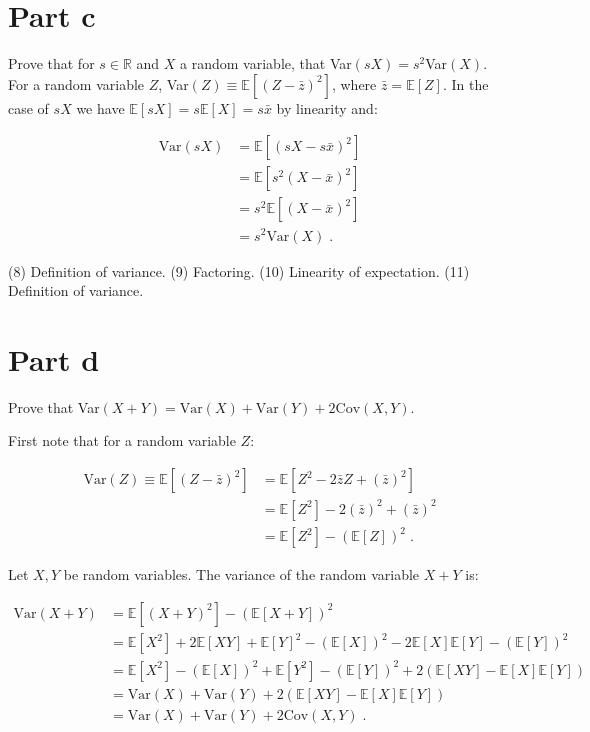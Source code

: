 \documentclass[11pt]{article}
\begin{document}
\section*{Part c}

Prove that for $s \in \mathbb{R}$ and $X$ a random variable, that Var$(sX) = s^2$Var$(X)$. \\

For a random variable $Z$, Var$(Z) \equiv \mathbb{E}[(Z - \bar{z})^2]$, where $\bar{z} = \mathbb{E}[Z]$. In the case of $sX$ we have $\mathbb{E}[sX] = s\mathbb{E}[X] = s\bar{x}$ by linearity and:

\begin{align}
\text{Var}(sX) &= \mathbb{E}[(sX-s\bar{x})^2] \\
&= \mathbb{E}[s^2(X-\bar{x})^2] \\
&= s^2\mathbb{E}[(X-\bar{x})^2]\\
&= s^2 \text{Var}(X) \;.
\end{align}

(8) Definition of variance. (9) Factoring. (10) Linearity of expectation. (11) Definition of variance. 

\section*{Part d}

Prove that Var$(X+Y) = \text{Var}(X) + \text{Var}(Y) + 2\text{Cov}(X,Y)$. 

First note that for a random variable $Z$:

\begin{align*}
\text{Var}(Z) \equiv \mathbb{E}[(Z - \bar{z})^2] &= \mathbb{E}[Z^2 - 2\bar{z}Z + (\bar{z})^2] \\
&= \mathbb{E}[Z^2] -2(\bar{z})^2 + (\bar{z})^2 \\
&= \mathbb{E}[Z^2] - (\mathbb{E}[Z])^2 \;.
\end{align*}

Let $X,Y$ be random variables. The variance of the random variable $X+Y$ is:

\begin{align*}
\text{Var}(X+Y) &= \mathbb{E}[(X+Y)^2] - (\mathbb{E}[X+Y])^2 \\
&= \mathbb{E}[X^2] + 2\mathbb{E}[XY] + \mathbb{E}[Y]^2 - (\mathbb{E}[X])^2 - 2\mathbb{E}[X]\mathbb{E}[Y] - (\mathbb{E}[Y])^2 \\
&= \mathbb{E}[X^2] - (\mathbb{E}[X])^2 + \mathbb{E}[Y^2] - (\mathbb{E}[Y])^2 + 2\left(\mathbb{E}[XY] - \mathbb{E}[X]\mathbb{E}[Y]\right) \\
&= \text{Var}(X) + \text{Var}(Y) + 2\left(\mathbb{E}[XY] - \mathbb{E}[X]\mathbb{E}[Y]\right) \\
&= \text{Var}(X) + \text{Var}(Y) + 2\text{Cov}(X,Y) \;.
\end{align*}
\end{document}

